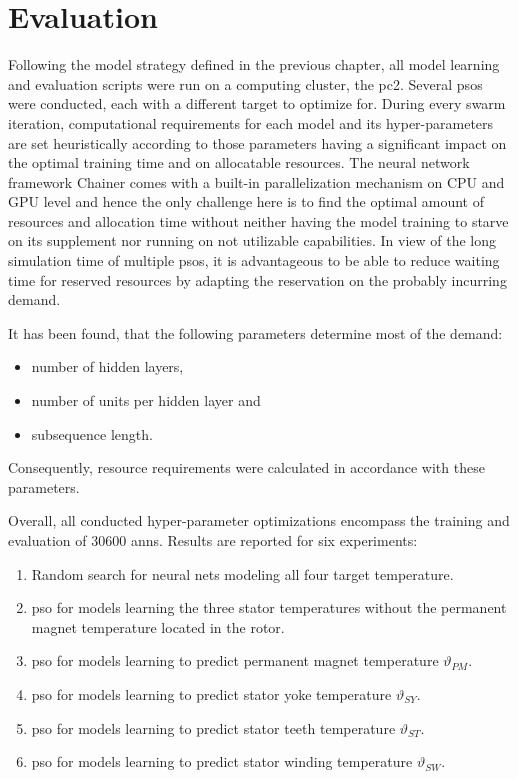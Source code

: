 \chapter{Evaluation} 
\label{cha:evaluation}
Following the model strategy defined in the previous chapter, all model learning and evaluation scripts were run on a computing cluster, the \gls{pc2}.
Several \glspl{pso} were conducted, each with a different target to optimize for.
During every swarm iteration, computational requirements for each model and its hyper-parameters are set heuristically according to those parameters having a significant impact on the optimal training time and on allocatable resources.
The neural network framework Chainer comes with a built-in parallelization mechanism on CPU and GPU level and hence the only challenge here is to find the optimal amount of resources and allocation time without neither having the model training to starve on its supplement nor running on not utilizable capabilities.
In view of the long simulation time of multiple \glspl{pso}, it is advantageous to be able to reduce waiting time for reserved resources by adapting the reservation on the probably incurring demand.

It has been found, that the following parameters determine most of the demand:
\begin{itemize}
	\item number of hidden layers,
	\item number of units per hidden layer and
	\item subsequence length.
\end{itemize}
Consequently, resource requirements were calculated in accordance with these parameters.

Overall, all conducted hyper-parameter optimizations encompass the training and evaluation of 30600 \glspl{ann}.
Results are reported for six experiments: 
\begin{enumerate}
	\item Random search for neural nets modeling all four target temperature.
	\item \gls{pso} for models learning the three stator temperatures without the permanent magnet temperature located in the rotor.
	\item \gls{pso} for models learning to predict permanent magnet temperature $\vartheta_{PM}$.
	\item \gls{pso} for models learning to predict stator yoke temperature $\vartheta_{SY}$.
	\item \gls{pso} for models learning to predict stator teeth temperature $\vartheta_{ST}$.
	\item \gls{pso} for models learning to predict stator winding temperature $\vartheta_{SW}$.
\end{enumerate}

